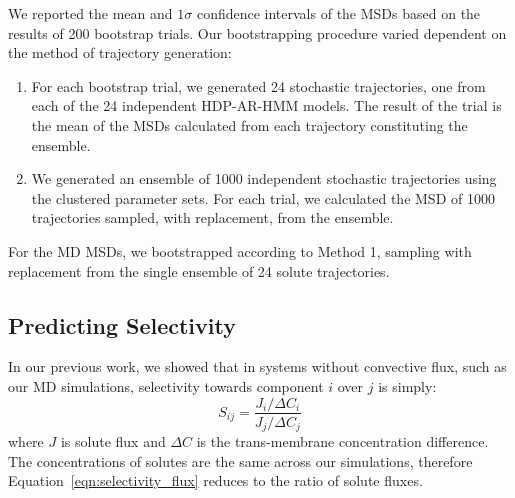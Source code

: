 \documentclass[journal=jpcbfk,manuscript=article]{achemso}
\begin{document}
  We reported the mean and $1 \sigma$ confidence intervals of the MSDs based on the 
  results of 200 bootstrap trials. Our bootstrapping procedure varied dependent on the
  method of trajectory generation:
  \begin{enumerate}[label={Method \theenumi :}, leftmargin=3.5\parindent]
  	\item For each bootstrap trial, we generated 24 stochastic trajectories, one from
  	each of the 24 independent HDP-AR-HMM models. The result of the trial is the mean
  	of the MSDs calculated from each trajectory constituting the ensemble. 
    \item We generated an ensemble of 1000 independent stochastic trajectories using
    the clustered parameter sets. For each trial, we calculated the MSD of 1000 
    trajectories sampled, with replacement, from the ensemble.
  \end{enumerate}

  For the MD MSDs, we bootstrapped according to Method 1, sampling with 
  replacement from the single ensemble of 24 solute trajectories.
  
  \subsection{Predicting Selectivity}\label{method:selectivity}
  
  In our previous work, we showed that in systems without convective flux, such
  as our MD simulations, selectivity towards component $i$ over $j$ is simply:
  \begin{equation}
  S_{ij} = \frac{J_i / \Delta C_i}{J_j / \Delta C_j}
  \label{eqn:selectivity_flux}
  \end{equation}
  where $J$ is solute flux and $\Delta C$ is the trans-membrane concentration
  difference.~\cite{coscia_capturing_2020} The concentrations of solutes are the
  same across our simulations, therefore Equation~\ref{eqn:selectivity_flux} 
  reduces to the ratio of solute fluxes. 
  
\end{document}
